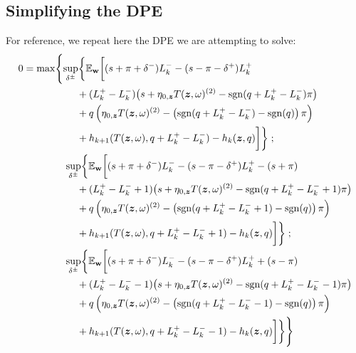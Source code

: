 \subsection{Simplifying the DPE}
For reference, we repeat here the DPE we are attempting to solve:
\begin{equation}
\begin{split}
0 & = \max \Biggl\lbrace 
\sup_{\delta^\pm} \biggl\lbrace \E_{\bw} \biggl[
(s + \pi + \delta^-)L_k^- - (s - \pi - \delta^+)L_k^+ \\
& \hphantom{\sup_{\bu} \biggl\lbrace \E_{\bw} \biggl[ {}+{}} + (L_k^+ - L_k^-) \bigl( s + \eta_{0,\bz} T(\bz, \omega)^{(2)}  -\sgn( q + L_k^+ - L_k^-)\pi   \bigr) \\
& \hphantom{\sup_{\bu} \biggl\lbrace \E_{\bw} \biggl[ {}+{}} + q\left( \eta_{0,\bz} T(\bz, \omega)^{(2)}  -\left( \sgn( q + L_k^+ - L_k^-) - \sgn(q) \right) \pi \right) \\
& \hphantom{\sup_{\bu} \biggl\lbrace \E_{\bw} \biggl[ {}+{}} + h_{k+1}(T(\bz,\omega), q + L_k^+ - L_k^- ) -  h_k(\bz,q) \biggr] \biggr\rbrace \; ;\\
& \hphantom{{}={} \max \biggl\lbrace } \sup_{\delta^\pm} \biggl\lbrace \E_{\bw} \biggl[
(s + \pi + \delta^-)L_k^- - (s - \pi - \delta^+)L_k^+ - (s + \pi)\\
& \hphantom{\sup_{\bu} \biggl\lbrace \E_{\bw} \biggl[ {}+{}} + (L_k^+ - L_k^- +1) \bigl( s + \eta_{0,\bz} T(\bz, \omega)^{(2)}  -\sgn( q + L_k^+ - L_k^- +1)\pi   \bigr) \\
& \hphantom{\sup_{\bu} \biggl\lbrace \E_{\bw} \biggl[ {}+{}} + q\left( \eta_{0,\bz} T(\bz, \omega)^{(2)}  -\left( \sgn( q + L_k^+ - L_k^- +1) - \sgn(q) \right) \pi \right) \\
& \hphantom{\sup_{\bu} \biggl\lbrace \E_{\bw} \biggl[ {}+{}} + h_{k+1}(T(\bz,\omega), q + L_k^+ - L_k^- + 1) -  h_k(\bz,q) \biggr] \biggr\rbrace \; ; \\
& \hphantom{{}={} \max \biggl\lbrace } \sup_{\delta^\pm} \biggl\lbrace \E_{\bw} \biggl[
(s + \pi + \delta^-)L_k^- - (s - \pi - \delta^+)L_k^+ + (s - \pi) \\
& \hphantom{\sup_{\bu} \biggl\lbrace \E_{\bw} \biggl[ {}+{}} + (L_k^+ - L_k^- -1) \bigl( s + \eta_{0,\bz} T(\bz, \omega)^{(2)}  -\sgn( q + L_k^+ - L_k^- -1)\pi   \bigr) \\
& \hphantom{\sup_{\bu} \biggl\lbrace \E_{\bw} \biggl[ {}+{}} + q\left( \eta_{0,\bz} T(\bz, \omega)^{(2)}  -\left( \sgn( q + L_k^+ - L_k^- -1) - \sgn(q) \right) \pi \right) \\
& \hphantom{\sup_{\bu} \biggl\lbrace \E_{\bw} \biggl[ {}+{}} + h_{k+1}(T(\bz,\omega), q + L_k^+ - L_k^- -1) -  h_k(\bz,q) \biggr] \biggr\rbrace  \Biggr\rbrace
\end{split}
\end{equation}
